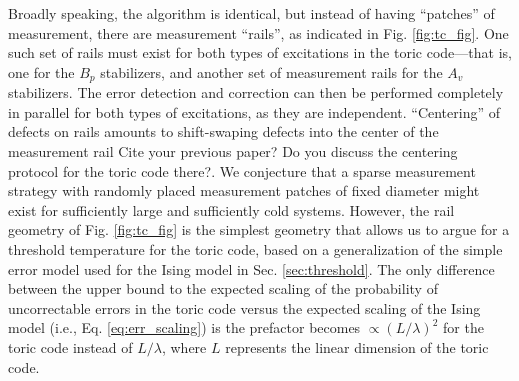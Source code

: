 \documentclass[twocolumn,superscriptaddress,aps,prb,floatfix]{revtex4-1}
\newcommand{\figref}[1]{Fig. \ref{#1}}
\newcommand{\MS}[1]{{\color{mauve} {#1}}}
\begin{document}
 Broadly speaking, the algorithm is identical, but instead of having ``patches'' of measurement, there are measurement ``rails'', as indicated in \figref{fig:tc_fig}.  One such set of rails must exist for both types of excitations in the toric code---that is, one for the $B_p$ stabilizers, and another set of measurement rails for the $A_v$ stabilizers.  The error detection and correction can then be performed completely in parallel for both types of excitations, as they are independent.  ``Centering'' of defects on rails amounts to shift-swaping defects into the center of the measurement rail \MS{Cite your previous paper? Do you discuss the centering protocol for the toric code there?}.  We conjecture that a sparse measurement strategy with randomly placed measurement patches of fixed diameter might exist for sufficiently large and sufficiently cold systems.  However, the rail geometry of \figref{fig:tc_fig} is the simplest geometry that allows us to argue for a threshold temperature for the toric code, based on a generalization of the simple error model used for the Ising model in Sec. \ref{sec:threshold}.  The only difference between the upper bound to the expected scaling of the probability of uncorrectable errors in the toric code versus the expected scaling of the Ising model (i.e., Eq. \ref{eq:err_scaling}) is the prefactor becomes $\propto (L/\lambda)^2$ for the toric code instead of $L/\lambda$, where $L$ represents the linear dimension of the toric code.
\end{document}
